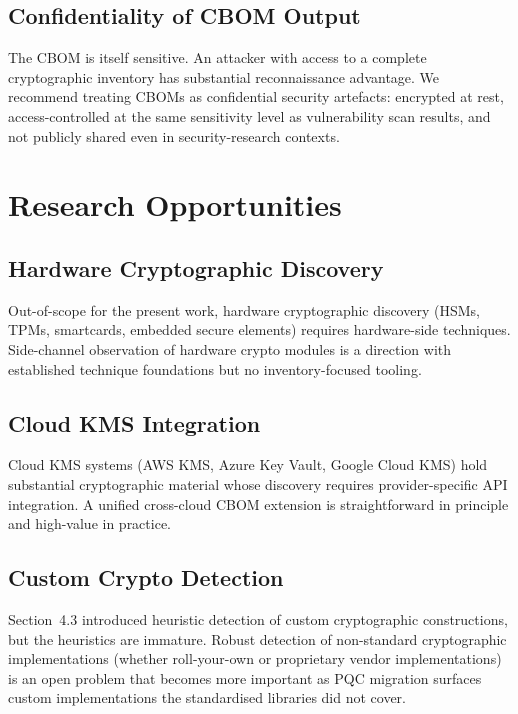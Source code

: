 \documentclass[sigconf,nonacm]{acmart}
\begin{document}
\subsection{Confidentiality of CBOM Output}

The CBOM is itself sensitive. An attacker with access to a
complete cryptographic inventory has substantial reconnaissance
advantage. We recommend treating CBOMs as confidential security
artefacts: encrypted at rest, access-controlled at the same
sensitivity level as vulnerability scan results, and not publicly
shared even in security-research contexts.

\section{Research Opportunities}

\subsection{Hardware Cryptographic Discovery}

Out-of-scope for the present work, hardware cryptographic discovery
(HSMs, TPMs, smartcards, embedded secure elements) requires
hardware-side techniques. Side-channel observation of hardware
crypto modules is a direction with established technique foundations
but no inventory-focused tooling.

\subsection{Cloud KMS Integration}

Cloud KMS systems (AWS KMS, Azure Key Vault, Google Cloud KMS) hold
substantial cryptographic material whose discovery requires
provider-specific API integration. A unified cross-cloud CBOM
extension is straightforward in principle and high-value in
practice.

\subsection{Custom Crypto Detection}

Section~4.3 introduced heuristic detection of custom cryptographic
constructions, but the heuristics are immature. Robust detection of
non-standard cryptographic implementations (whether
roll-your-own or proprietary vendor implementations) is an open
problem that becomes more important as PQC migration surfaces
custom implementations the standardised libraries did not cover.
\end{document}
